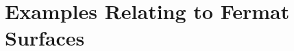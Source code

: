 \documentclass[main.tex]{subfiles}
\begin{document}
\chapter{Examples Relating to Fermat Surfaces}


\ifSubfilesClassLoaded{%
  
  
}{}
\end{document}
